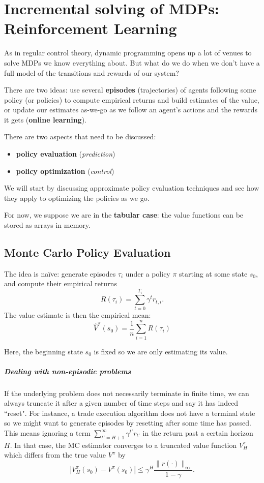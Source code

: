 \documentclass[../course-notes.tex]{subfiles}
\begin{document}
\chapter{Incremental solving of MDPs: Reinforcement Learning}\label{chap:incrRL}

As in regular control theory, dynamic programming opens up a lot of venues to solve MDPs we know everything about. But what do we do when we don't have a full model of the transitions and rewards of our system?

There are two ideas: use several \textbf{\bluefont episodes} (trajectories) of agents following some policy (or policies) to compute empirical returns and build estimates of the value, or update our estimates as-we-go as we follow an agent's actions and the rewards it gets (\textbf{\bluefont online learning}).


There are two aspects that need to be discussed:
\begin{itemize}
	\item \textbf{policy evaluation} (\textit{prediction})
	\item \textbf{policy optimization} (\textit{control})
\end{itemize}


We will start by discussing approximate policy evaluation techniques and see how they apply to optimizing the policies as we go.

For now, we suppose we are in the \textbf{tabular case}: the value functions can be stored as arrays in memory.


\section{Monte Carlo Policy Evaluation}

The idea is naïve: generate episodes $\tau_i$ under a policy $\pi$ starting at some state $s_0$, and compute their empirical returns
\[
	R(\tau_i) = \sum_{t=0}^{T_i} \gamma^t r_{t,i}.
\]
The value estimate is then the empirical mean:
\begin{equation}
	\widehat{V}^\pi(s_0) = \frac{1}{n}\sum_{i=1}^{n} R(\tau_i)
\end{equation}

Here, the beginning state $s_0$ is fixed so we are only estimating its value.


\paragraph{Dealing with non-episodic problems} If the underlying problem does not necessarily terminate in finite time, we can always truncate it after a given number of time steps and say it has indeed ``reset". For instance, a trade execution algorithm does not have a terminal state so we might want to generate episodes by resetting after some time has passed. This means ignoring a term $\sum_{t'=H+1}^\infty \gamma^{t'} r_{t'}$ in the return past a certain horizon $H$. In that case, the MC estimator converges to a truncated value function $V_H^\pi$ which differs from the true value $V^\pi$ by
\[
	|V_H^\pi(s_0) - V^\pi(s_0)| \leq \gamma^H\frac{\| r(\cdot)\|_\infty}{1 - \gamma}.
\]
\end{document}
